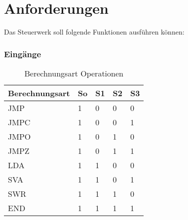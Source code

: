 \chapter{Anforderungen}
\label{chap:anforderungen}

Das Steuerwerk soll folgende Funktionen ausführen können:

\subsection{Eingänge}
\label{sec:eingänge}

\begin{table}[ht]
    \centering
    \begin{tabular}{| l | l | l | l| l |}
        \hline
        \cellcolor[gray]{0.8} \textbf{Berechnungsart} & \cellcolor[gray]{0.8} \textbf{So} & \cellcolor[gray]{0.8} \textbf{S1} &
        \cellcolor[gray]{0.8} \textbf{S2}             & \cellcolor[gray]{0.8} \textbf{S3}                                             \\
        \hline
        JMP                                           & 1                                 & 0                                 & 0 & 0 \\
        \hline
        JMPC                                          & 1                                 & 0                                 & 0 & 1 \\
        \hline
        JMPO                                          & 1                                 & 0                                 & 1 & 0 \\
        \hline
        JMPZ                                          & 1                                 & 0                                 & 1 & 1 \\
        \hline
        LDA                                           & 1                                 & 1                                 & 0 & 0 \\
        \hline
        SVA                                           & 1                                 & 1                                 & 0 & 1 \\
        \hline
        SWR                                           & 1                                 & 1                                 & 1 & 0 \\
        \hline
        END                                           & 1                                 & 1                                 & 1 & 1 \\
        \hline
    \end{tabular}
    \caption{Berechnungsart Operationen}
    \label{tab:berechnungsart-operationen}
\end{table}

